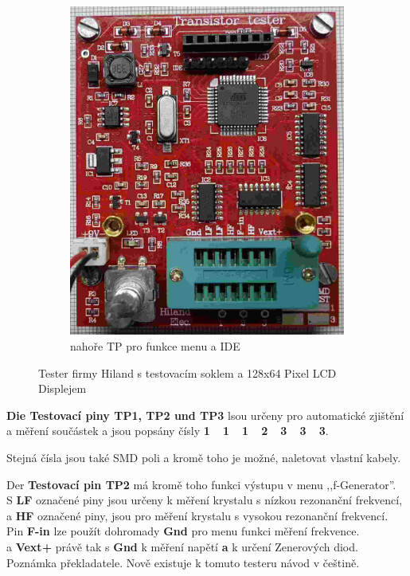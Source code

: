 \begin{figure}[H]
\begin{subfigure}[b]{.5\textwidth}
    \includegraphics[width=.756\textwidth]{../PNG/Hi_o.jpg}
    \caption{nahoře TP pro funkce menu a IDE}
  \end{subfigure}
  \caption{Tester firmy Hiland s testovacím soklem a 128x64 Pixel LCD Displejem}
  \label{fig:Hiland}
\end{figure}

{\textbf {Die Testovací piny TP1, TP2 und TP3}} lsou určeny pro automatické zjištění a měření součástek a jsou popsány čísly {\textbf {1~~1~~1~~2~~3~~3~~3}}.

Stejná čísla jsou také SMD poli a kromě toho je možné, naletovat vlastní kabely.

Der \textbf {Testovací pin TP2} má kromě toho funkci výstupu v menu ,,f-Generator''.
\\S \textbf{ LF} označené piny jsou určeny k měření krystalu s nízkou rezonanční frekvencí,
\\a \textbf{ HF} označené piny, jsou pro měření krystalu s vysokou rezonanční frekvencí.
\\
Pin \textbf {F-in} lze použít dohromady {\textbf {Gnd}} pro menu funkci měření frekvence.
\\a \textbf {Vext+} právě tak s {\textbf {Gnd}} k měření napětí {\textbf a} k určení Zenerových diod.\\

Poznámka překladatele. Nově existuje k tomuto testeru návod v češtině.

